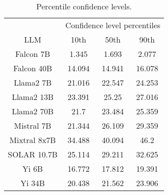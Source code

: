 \begin{table*}
\centering
\begin{tabular}{c|c|c|c}
& \multicolumn{3}{c}{Confidence level percentiles} \\ 
LLM & 10th & 50th & 90th\\ \hline
Falcon 7B & 1.345 & 1.693 & 2.077\\
Falcon 40B & 14.094 & 14.941 & 16.078\\
Llama2 7B & 21.016 & 22.547 & 24.253\\
Llama2 13B & 23.391 & 25.25 & 27.016\\
Llama2 70B & 21.7 & 23.484 & 25.359\\
Mistral 7B & 21.344 & 26.109 & 29.359\\
Mixtral 8x7B & 34.488 & 40.094 & 46.2\\
SOLAR 10.7B & 25.114 & 29.211 & 32.625\\
Yi 6B & 16.772 & 17.812 & 19.391\\
Yi 34B & 20.438 & 21.562 & 23.906\\
\hline
\end{tabular}
\caption{Percentile confidence levels.}
\label{tab:percentile_conf}
\end{table*}
